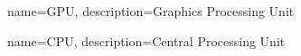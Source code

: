 {
  name={GPU},
  description={{Graphics Processing Unit}}
}

{
  name={CPU},
  description={{Central Processing Unit}}
}